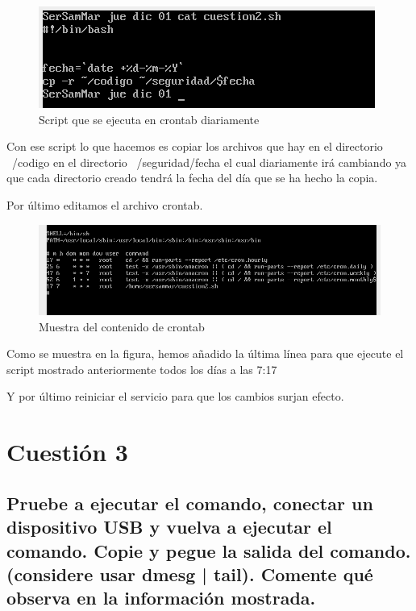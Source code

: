 \begin{figure}[H] %
	\centering
	\includegraphics[scale=0.5]{imagenes/script-cron.png}  %
	\caption{Script que se ejecuta en crontab diariamente}
\end{figure}

Con ese script lo que hacemos es copiar los archivos que hay en el directorio ~/codigo en el directorio ~/seguridad/fecha el cual diariamente irá cambiando ya que cada directorio creado tendrá la fecha del día que se ha hecho la copia.

Por último editamos el archivo crontab.
\begin{figure}[H] %
	\centering
	\includegraphics[scale=0.5]{imagenes/crontab.png}  %
	\caption{Muestra del contenido de crontab}
\end{figure}

Como se muestra en la figura, hemos añadido la última línea para que ejecute el script mostrado anteriormente todos los días a las 7:17

Y por último reiniciar el servicio para que los cambios surjan efecto.

\section{Cuestión 3}

\subsection{\Large Pruebe a ejecutar el comando, conectar un dispositivo USB y vuelva a ejecutar el comando. Copie y pegue la salida del comando. (considere usar dmesg | tail). Comente qué observa en la información mostrada.}

